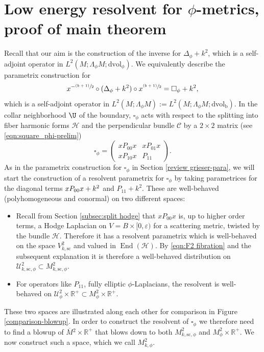 \documentclass[JEP,XML,SOM,Unicode,NoFloatCountersInSection,published]{cedram}
\newcommand{\psfrac}[2]{\sfrac{(#1)}{#2}}
\theoremstyle{plain}
\theoremstyle{definition}
\newcommand{\R}{{\mathbb{R}}}
\newcommand{\Umath}{{\mathscr{U}}}
\newcommand{\Hmath}{{\mathscr{H}}}
\newcommand{\bb}{{\mathrm{b}}}
\newcommand{\ssc}{{\mathrm{sc}}}
\newcommand{\dvol}{\mathrm{dvol}}
\DeclareMathOperator{\End}{End}
\newcommand{\Mbar}{{\overline{M}}}\let\M\Mbar
\let\eps\varepsilon
\begin{document}
\section{Low energy resolvent for \texorpdfstring{$\phi$}{phi}-metrics, proof of main theorem} \label{sec:proof main thm}
Recall that our aim is the construction of the inverse for $\Delta_{\phi} +k^2$, which is a self-adjoint operator in $L^2(M;\Lambda_\phi M;\dvol_\phi)$. We equivalently describe the parametrix construction for
\[
x^{-\psfrac{b+1}{2}} \circ (\Delta_{\phi} +k^2) \circ x^{\psfrac{b+1}{2}} = \square_\phi + k^2,
\]
which is a self-adjoint operator in $L^2(M;\Lambda_\phi M):=L^2(M;\Lambda_\phi M;\dvol_\bb)$. In the collar neighborhood
$\U$ of the boundary, $\square_\phi$ acts with respect to the splitting into
fiber harmonic forms $\mathscr{H}$ and the perpendicular bundle $\mathscr{C}$ by
a $2\times 2$ matrix (see \eqref{eqn:square_phi-prelim})
\begin{equation*}
\square_\phi =
\begin{pmatrix}
xP_{00}x & xP_{01}x \\
xP_{10}x & P_{11}
\end{pmatrix}.
\end{equation*}
As in the parametrix construction for $\square_\phi$ in Section \ref{review grieser-para}, we will start the construction of a resolvent parametrix for $\square_\phi$ by taking parametrices for the diagonal terms $xP_{00}x+\nobreak k^2$ and $P_{11}+k^2$. These are
well-behaved (\ie polyhomogeneous and conormal) on two different spaces:
\begin{itemize}
\item
Recall from Section \ref{subsec:split hodge} that $xP_{00}x$ is, up to higher order terms, a Hodge Laplacian on $V=B\times[0,\eps)$ for a scattering metric, twisted by the bundle $\Hmath$. Therefore it has a resolvent parametrix which is
well-behaved on the space $V^2_{k,\ssc}$ and valued in $\End(\Hmath)$. By \eqref{eqn:F2 fibration} and the subsequent explanation it is therefore a well-behaved distribution on $\Umath^2_{k,\ssc,\phi}\subset M^2_{k,\ssc,\phi}$.
\item
For operators like $P_{11}$, \ie fully elliptic $\phi$-Laplacians, the resolvent is well-behaved on
$\Umath^{2}_{\phi} \times \R^+\subset M^{2}_{\phi} \times \R^+$.
\end{itemize}
These two spaces are illustrated along each
other for comparison in Figure \ref{comparison-blowup}.
In order to construct the resolvent of $\square_\phi$ we therefore need to find a blowup of
$\Mbar{}^2 \times \R^+$ that blows down to both $M^{2}_{k, \ssc,\phi}$ and $M^{2}_{\phi} \times \R^+$.
We now construct such a space, which we call $M^{2}_{k,\phi}$.
\end{document}
